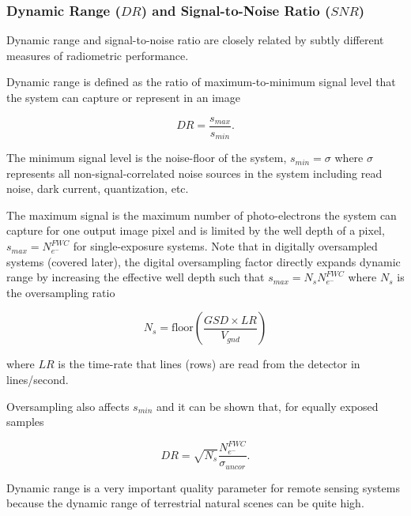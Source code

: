 \documentclass[10pt,journal]{IEEEtran}  %
\begin{document}
\subsubsection{Dynamic Range ($DR$) and Signal-to-Noise Ratio ($SNR$)}

Dynamic range and signal-to-noise ratio are closely related by subtly different measures of radiometric performance.

Dynamic range is defined as the ratio of maximum-to-minimum signal level that the system can capture or represent in an image

\begin{equation*}
    DR = \frac{s_{max}}{s_{min}}.
\end{equation*}

The minimum signal level is the noise-floor of the system, $s_{min} = \sigma$ where $\sigma$ represents all non-signal-correlated noise sources in the system including read noise, dark current, quantization, etc.

The maximum signal is the maximum number of photo-electrons the system can capture for one output image pixel and is limited by the well depth of a pixel, $s_{max} = N_{e^-}^{FWC}$ for single-exposure systems.  Note that in digitally oversampled systems (covered later), the digital oversampling factor directly expands dynamic range by increasing the effective well depth such that $s_{max} = N_s N_{e^-}^{FWC}$ where $N_s$ is the oversampling ratio


\begin{equation}
    N_s = \text{floor}\left(\frac{GSD \times LR}{V_{gnd}}\right)
    \label{eq:N_s}
\end{equation}

where $LR$ is the time-rate that lines (rows) are read from the detector in lines/second.

Oversampling also affects $s_{min}$ and it can be shown that, for equally exposed samples

\begin{equation}
    DR = \sqrt{N_s}\frac{N_{e^-}^{FWC}}{\sigma_{uncor}}.
\label{eq:DR_OS}
\end{equation}

Dynamic range is a very important quality parameter for remote sensing systems because the dynamic range of terrestrial natural scenes can be quite high. 
\end{document}
